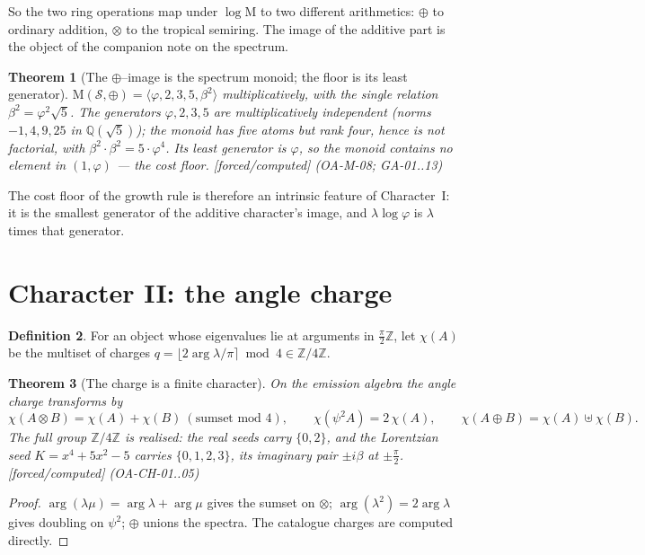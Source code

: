 \documentclass[11pt]{article}
\newcommand{\stag}[1]{{\small\textsf{\textcolor{tagcol}{[#1]}}}}
\newcommand{\bk}[1]{{\small\textsf{(#1)}}}
\theoremstyle{plain}
\newtheorem{theorem}{Theorem}[section]
\theoremstyle{definition}
\newtheorem{definition}[theorem]{Definition}
\newcommand{\Sring}{\mathcal{S}}
\newcommand{\Z}{\mathbb{Z}}
\newcommand{\Q}{\mathbb{Q}}
\newcommand{\psitwo}{\psi^{2}}
\newcommand{\dsum}{\oplus}
\newcommand{\dten}{\otimes}
\newcommand{\Mahler}{\mathrm{M}}
\newcommand{\charge}{\chi}
\begin{document}
\noindent So the two ring operations map under $\log\Mahler$ to two different arithmetics: $\dsum$ to ordinary addition, $\dten$ to the tropical semiring. The image of the additive part is the object of the companion note on the spectrum.

\begin{theorem}[The $\dsum$--image is the spectrum monoid; the floor is its least generator]\label{thm:floor}
$\Mahler(\Sring,\dsum)=\langle\varphi,2,3,5,\beta^2\rangle$ multiplicatively, with the single relation $\beta^2=\varphi^2\sqrt5$. The generators $\varphi,2,3,5$ are multiplicatively independent (norms $-1,4,9,25$ in $\Q(\sqrt5)$); the monoid has five atoms but rank four, hence is not factorial, with $\beta^2\!\cdot\!\beta^2=5\cdot\varphi^4$. Its least generator is $\varphi$, so the monoid contains no element in $(1,\varphi)$ --- the cost floor. \stag{forced/computed} \bk{OA-M-08; GA-01..13}
\end{theorem}

\noindent The cost floor of the growth rule is therefore an intrinsic feature of Character~I: it is the smallest generator of the additive character's image, and $\lambda\log\varphi$ is $\lambda$ times that generator.

\section{Character II: the angle charge}\label{sec:charge}

\begin{definition}
For an object whose eigenvalues lie at arguments in $\tfrac\pi2\Z$, let $\charge(A)$ be the multiset of charges $q=\lfloor 2\arg\lambda/\pi\rceil \bmod 4 \in\Z/4\Z$.
\end{definition}

\begin{theorem}[The charge is a finite character]\label{thm:charge}
On the emission algebra the angle charge transforms by
\[
\charge(A\dten B)=\charge(A)+\charge(B)\ (\text{sumset mod }4),\qquad
\charge(\psitwo A)=2\,\charge(A),\qquad
\charge(A\dsum B)=\charge(A)\uplus\charge(B).
\]
The full group $\Z/4\Z$ is realised: the real seeds carry $\{0,2\}$, and the Lorentzian seed $K=x^4+5x^2-5$ carries $\{0,1,2,3\}$, its imaginary pair $\pm i\beta$ at $\pm\tfrac\pi2$. \stag{forced/computed} \bk{OA-CH-01..05}
\end{theorem}

\begin{proof}
$\arg(\lambda\mu)=\arg\lambda+\arg\mu$ gives the sumset on $\dten$; $\arg(\lambda^2)=2\arg\lambda$ gives doubling on $\psitwo$; $\dsum$ unions the spectra. The catalogue charges are computed directly.
\end{proof}
\end{document}
